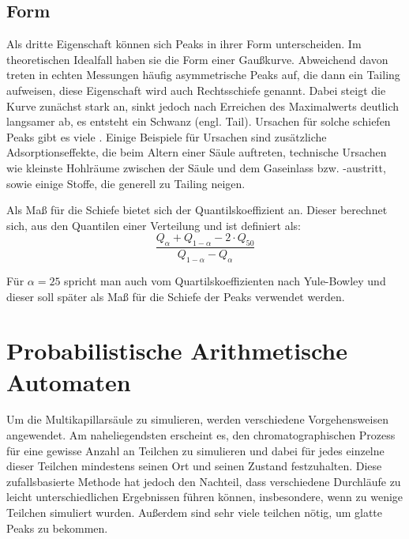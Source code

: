 \subsection{Form}
Als dritte Eigenschaft können sich Peaks in ihrer Form unterscheiden. Im theoretischen Idealfall haben sie die Form einer Gaußkurve. %
Abweichend davon treten in echten Messungen häufig asymmetrische Peaks auf, die dann ein Tailing aufweisen, diese Eigenschaft wird auch Rechtsschiefe genannt. Dabei steigt die Kurve zunächst stark an, sinkt jedoch nach Erreichen des Maximalwerts deutlich langsamer ab, es entsteht ein Schwanz (engl. Tail).
Ursachen für solche schiefen Peaks gibt es viele \citep{kolb2003, Moretti2004, Giddings1963}. Einige Beispiele für Ursachen sind zusätzliche Adsorptionseffekte, die beim Altern einer Säule auftreten, technische Ursachen wie kleinste Hohlräume zwischen der Säule und dem Gaseinlass bzw. -austritt, sowie einige Stoffe, die generell zu Tailing neigen. %

Als Maß für die Schiefe bietet sich der Quantilskoeffizient \citep{johnson1994} an.
Dieser berechnet sich, aus den Quantilen einer Verteilung und ist definiert als: 
\begin{equation}
\frac{Q_{\alpha} + Q_{1-\alpha} -2\cdot Q_{50} }{ Q_{1-\alpha} - Q_{\alpha}}
\end{equation}

Für $\alpha = 25$ spricht man auch vom Quartilskoeffizienten nach Yule-Bowley und dieser soll später als Maß für die Schiefe der Peaks verwendet werden.


\section{Probabilistische Arithmetische Automaten}
Um die Multikapillarsäule zu simulieren, werden verschiedene Vorgehensweisen angewendet. Am naheliegendsten erscheint es, den chromatographischen Prozess für eine gewisse Anzahl an Teilchen zu simulieren und dabei für jedes einzelne dieser Teilchen mindestens seinen Ort und seinen Zustand festzuhalten. Diese zufallsbasierte Methode hat jedoch den Nachteil, dass verschiedene Durchläufe zu leicht unterschiedlichen Ergebnissen führen können, insbesondere, wenn zu wenige Teilchen simuliert wurden.
Außerdem sind sehr viele teilchen nötig, um glatte Peaks zu bekommen.

